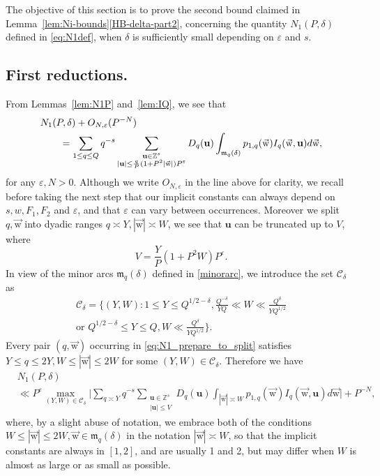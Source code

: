 \documentclass[letterpaper,11pt]{amsart}
\numberwithin{equation}{section}
\theoremstyle{definition}
\numberwithin{equation}{section}
\newcommand{\ZZ}{\mathbb{Z}}
\newcommand{\uu}{\mathbf{u}}
\newcommand{\uw}{{\vec{\mathrm{w}}}}
\newcommand{\scrm}{\mathfrak{m}}
\begin{document}
    The objective of this section is to prove the second bound claimed in Lemma~\ref{lem:Ni-bounds}\eqref{HB-delta-part2}, concerning the quantity
     $N_1(P, \delta)$ defined in \eqref{eq:N1def},
    when $\delta$ is sufficiently small depending on $\varepsilon$ and $s$.

 \subsection{First reductions.}
	From Lemmas~\ref{lem:N1P} and~\ref{lem:IQ}, we see that 
	\begin{align}\nonumber
	\MoveEqLeft N_1(P, \delta)+O_{N,\varepsilon}(P^{- N})\\
    & =\sum_{1\leq q\leq  Q}q^{-s}\sum_{\substack{\uu \in \ZZ^s\\ |\uu|\leq \frac{q}{P}(1+P^2|\uw|)P^\varepsilon}}D_q(\uu)\int_{\scrm_q(\delta)}p_{1, q}(\uw)I_q(\uw, \uu)d\uw,\label{eq:N1_prepare_to_split}
	\end{align}
 for any \(\varepsilon,N>0\). Although we write $O_{N,\varepsilon}$ in the line above for clarity, we recall before taking the next step that our implicit constants can always depend on \(s,w,F_1,F_2\) and \(\varepsilon\), and that \(\varepsilon\) can vary between occurrences.
		 Moreover we split $q, \uw$ into dyadic ranges $q\asymp Y,|\uw| \asymp W$, we see that $\uu$ can be truncated up to $V$, 
	 where 
	   \begin{equation}\label{defV}
	   V=\frac{Y}{P}(1+P^2W)P^\varepsilon.
	   \end{equation}
    In view of the minor arcs $\mathfrak m_q(\delta)$ defined in \eqref{minorarc}, we introduce the set $\mathcal C_\delta$ as
	     \begin{align}
  \label{YWcondition}
  \mathcal C_\delta=\Big\{ (Y, W):
  1\leq Y\leq Q^{1/2-\delta}, \frac{Q^{-\delta}}{YQ}\ll W\ll \frac{Q^\delta}{YQ^{1/2}} \\ \text{or } Q^{1/2-\delta}\leq  Y \leq Q, W\ll \frac{Q^\delta}{YQ^{1/2}}
  \Big\}.\nonumber
    \end{align}
    Every pair $(q,\uw)$ occurring in \eqref{eq:N1_prepare_to_split} satisfies $Y\leq q\leq 2 Y, W\leq |\uw|\leq 2 W$  for some $(Y,W)\in \mathcal C_\delta$. Therefore  we have
    \begin{align*}
        &N_1(P, \delta)\\ &\ll   P^{\varepsilon} \max_{(Y, W)\in \mathcal C_\delta}\bigg\lvert \sum_{q\asymp Y}q^{-s} \sum_{\substack{\uu\in \mathbb Z^s\\ |\uu|\leq V}}D_q(\uu) \int_{|\uw| \asymp W} p_{1, q}(\uw) I_q(\uw, \uu)d\uw\bigg\rvert+P^{-N},
	 \end{align*}
  where, by a slight abuse of notation, we embrace both of the conditions $W\leq |\uw|\leq 2 W, \uw\in \mathfrak m_q(\delta)$ in the notation $|\uw|\asymp W$, so that the implicit constants are always in $[1,2] $, and  are usually 1 and 2, but may differ when $W$ is almost  as large or as small as possible. 
  
\end{document}
